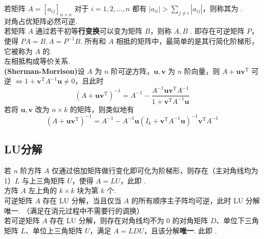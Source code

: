 \documentclass[./main.tex]{subfiles}
\begin{document}
若矩阵 $A=[a_{ij}]_{n\times n}$ 对于 $i=1,2,\dots,n$ 都有 $|a_{ii}|>\sum_{j\neq i}|a_{ij}|$，则称其为 . \\

对角占优矩阵必然可逆. \\

若矩阵 $A$ 通过若干初等\textbf{行变换}可以变为矩阵 $B$，则称 $A,B$ . 即存在可逆矩阵 $P$，使得 $PA=B,A=P^{-1}B$. 所有和 $A$ 相抵的矩阵中，最简单的是其行简化阶梯形，它被称为 $A$ 的. \\

左相抵构成等价关系. \\

\textbf{(Sherman-Morrison)}设 $A$ 为 $n$ 阶可逆方阵，$\bm{u},\bm{v}$ 为 $n$ 阶向量，则 $A+\bm{uv}^{\mathrm{T}}$ 可逆 $\iff 1+\bm{v}^{\mathrm{T}}A^{-1}\bm{u}\neq 0$，且此时
\begin{equation}
    (A+\bm{uv}^{\mathrm{T}})^{-1}=A^{-1}-\frac{A^{-1}\bm{uv}^{\mathrm{T}}A^{-1}}{1+\bm{v}^{\mathrm{T}}A^{-1}\bm{u}}
\end{equation}
若将 $\bm{u},\bm{v}$ 改为 $n\times k$ 的矩阵，则类似地有
\begin{equation}
    (A+\bm{uv}^{\mathrm{T}})^{-1}=A^{-1}-A^{-1}\bm{u}(I_k+\bm{v}^{\mathrm{T}}A^{-1}\bm{u})^{-1}\bm{v}^{\mathrm{T}}A^{-1}
\end{equation}

\subsection{LU分解}
若 $n$ 阶方阵 $A$ 仅通过倍加矩阵做行变化即可化为阶梯形，则存在（主对角线均为1）$L$ 与上三角矩阵 $U$，使得 $A=LU$，此即 . \\

方阵 $A$ 左上角的 $k\times k$ 块为第 $k$ 个. \\

可逆矩阵 $A$ 存在 LU 分解，当且仅当 $A$ 的所有顺序主子阵均可逆，此时 LU 分解唯一. （满足在消元过程中不需要行的调换）\\

若可逆矩阵 $A$ 存在 LU 分解，则存在对角线均不为 0 的对角矩阵 $D$、单位下三角矩阵 $L$、单位上三角矩阵 $U$，满足 $A=LDU$，且该分解\textbf{唯一}. 此即 . \\
\end{document}
